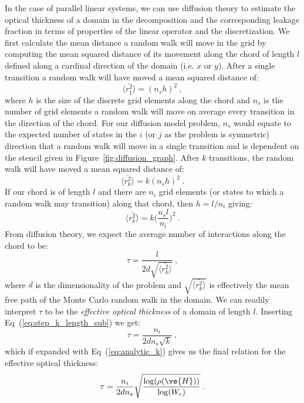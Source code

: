 \documentclass[preprint,11pt]{elsarticle}
\begin{document}
In the case of parallel linear systems, we can use diffusion theory to
estimate the optical thickness of a domain in the decomposition and the
corresponding leakage fraction in terms of properties of the linear operator
and the discretization. We first calculate the mean distance a random walk
will move in the grid by computing the mean squared distance of its movement
along the chord of length $l$ defined along a cardinal direction of the domain
(i.e. $x$ or $y$). After a single transition a random walk will have moved a
mean squared distance of:
\begin{equation}
  \langle \bar{r_1^2} \rangle = (n_s h)^2\:,
  \label{eq:step_1_length}
\end{equation}
where $h$ is the size of the discrete grid elements along the chord and $n_s$
is the number of grid elements a random walk will move on average every
transition in the direction of the chord. For our diffusion model problem,
$n_s$ would equate to the expected number of states in the $i$ (or $j$ as the
problem is symmetric) direction that a random walk will move in a single
transition and is dependent on the stencil given in
Figure~\ref{fig:diffusion_graph}. After $k$ transitions, the random walk will
have moved a mean squared distance of:
\begin{equation}
  \langle \bar{r_k^2} \rangle = k (n_s h)^2\:.
  \label{eq:step_k_length}
\end{equation}
If our chord is of length $l$ and there are $n_i$ grid elements (or
states to which a random walk may transition) along that chord, then $h =
l / n_i$ giving:
\begin{equation}
  \langle \bar{r_k^2} \rangle = k \Bigg(\frac{n_s l}{n_i}\Bigg)^2\:.
  \label{eq:step_k_length_sub}
\end{equation}
From diffusion theory, we expect the average number of interactions
along the chord to be:
\begin{equation}
  \tau = \frac{l}{2 d \sqrt{\langle \bar{r_k^2} \rangle}}\:,
  \label{eq:optical_thickness_1}
\end{equation}
where $d$ is the dimensionality of the problem and $\sqrt{\langle
  \bar{r_k^2} \rangle}$ is effectively the mean free path of the Monte
Carlo random walk in the domain. We can readily interpret $\tau$ to be the
\textit{effective optical thickness} of a domain of length
$l$. Inserting Eq~(\ref{eq:step_k_length_sub}) we get:
\begin{equation}
  \tau = \frac{n_i}{2 d n_s \sqrt{k}}\:,
  \label{eq:optical_thickness_2}
\end{equation}
which if expanded with Eq~(\ref{eq:analytic_k}) gives us the final
relation for the effective optical thickness:
\begin{equation}
  \tau = \frac{n_i}{2 d n_s}
  \sqrt{\frac{\log(\rho(\ve{H}))}{\log(W_c)}}\:.
  \label{eq:optical_thickness_3}
\end{equation}
\end{document}
